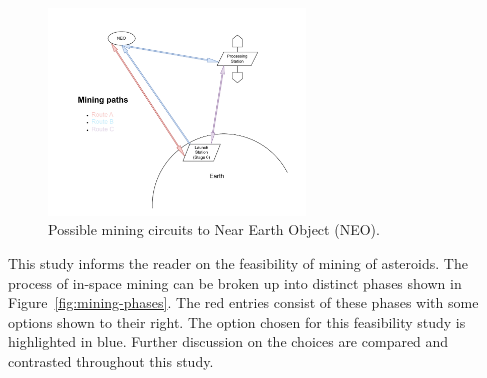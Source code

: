 \documentclass[conference]{IEEEtran}
\begin{document}
\begin{figure}[H]
\centering
\includegraphics[width=.8\linewidth, height=5.5cm]{mining_paths.pdf}
\caption{\label{fig:mining-circuits}Possible mining circuits to Near Earth Object (NEO).}
\end{figure}

This study informs the reader on the feasibility of mining of asteroids. The process of in-space mining can be broken up into distinct phases shown in Figure~\ref{fig:mining-phases}. The red entries consist of these phases with some options shown to their right. The option chosen for this feasibility study is highlighted in blue. Further discussion on the choices are compared and contrasted throughout this study.
\end{document}
